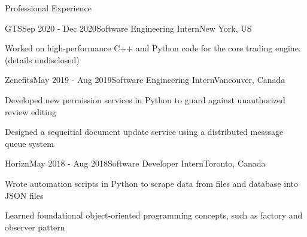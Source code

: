 \documentclass{cv}
\begin{document}
\begin{rSection}{Professional Experience}
\begin{rSubsection}{GTS}{Sep 2020 - Dec 2020}{Software Engineering Intern}{New York, US}
	\item Worked on high-performance C++ and Python code for the core trading engine. (details undisclosed)
\end{rSubsection}

\begin{rSubsection}{Zenefits}{May 2019 - Aug 2019}{Software Engineering Intern}{Vancouver, Canada}
	\item Developed new permission services in Python to guard against unauthorized review editing
	\item Designed a sequeitial document update service using a distributed messsage queue system
\end{rSubsection}

\begin{rSubsection}{Horizn}{May 2018 - Aug 2018}{Software Developer Intern}{Toronto, Canada}
	\item Wrote automation scripts in Python to scrape data from files and database into JSON files
	\item Learned foundational object-oriented programming concepts, such as factory and observer pattern
\end{rSubsection}
\end{rSection}
\end{document}

